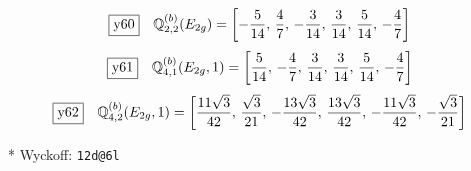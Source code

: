 \documentclass[fleqn,10pt,landscape]{jsarticle}
\begin{document}
\begin{dmath*}
\fbox{y60}\quad \mathbb{Q}_{2,2}^{(b)}(E_{2g})=\left[ - \frac{5}{14},\, \frac{4}{7},\, - \frac{3}{14},\, \frac{3}{14},\, \frac{5}{14},\, - \frac{4}{7} \right]
\end{dmath*}
\begin{dmath*}
\fbox{y61}\quad \mathbb{Q}_{4,1}^{(b)}(E_{2g},1)=\left[ \frac{5}{14},\, - \frac{4}{7},\, \frac{3}{14},\, \frac{3}{14},\, \frac{5}{14},\, - \frac{4}{7} \right]
\end{dmath*}
\begin{dmath*}
\fbox{y62}\quad \mathbb{Q}_{4,2}^{(b)}(E_{2g},1)=\left[ \frac{11 \sqrt{3}}{42},\, \frac{\sqrt{3}}{21},\, - \frac{13 \sqrt{3}}{42},\, \frac{13 \sqrt{3}}{42},\, - \frac{11 \sqrt{3}}{42},\, - \frac{\sqrt{3}}{21} \right]
\end{dmath*}
\vspace{5mm}

\noindent ** Wyckoff: \texttt{12d@6l}
\end{document}
